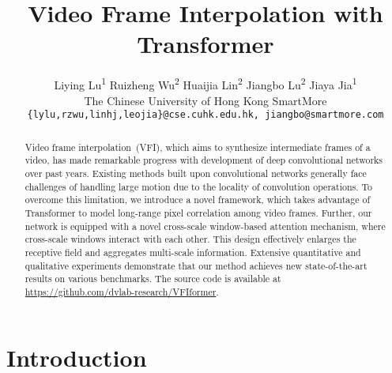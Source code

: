 \documentclass[10pt,twocolumn,letterpaper]{article}
\begin{document}
	
\title{Video Frame Interpolation with Transformer}
	
	\author{
		Liying Lu\textsuperscript{1} \quad Ruizheng Wu\textsuperscript{2} \quad Huaijia Lin\textsuperscript{2} \quad  Jiangbo Lu\textsuperscript{2} \quad Jiaya Jia\textsuperscript{1}\\
		 The Chinese University of Hong Kong \qquad
		 SmartMore\\
		{\tt\small \{lylu,rzwu,linhj,leojia\}@cse.cuhk.edu.hk, jiangbo@smartmore.com} 
	}
	
	
	\maketitle
	
\begin{abstract}
		Video frame interpolation~(VFI), which aims to synthesize intermediate frames of a video, has made remarkable progress with development of deep convolutional networks over past years. Existing methods built upon convolutional networks generally face challenges of handling large motion due to the locality of convolution operations. To overcome this limitation, we introduce a novel framework, which takes advantage of Transformer to model long-range pixel correlation among video frames. Further, our network is equipped with a novel cross-scale window-based attention mechanism, where cross-scale windows interact with each other. This design effectively enlarges the receptive field and aggregates multi-scale information. Extensive quantitative and qualitative experiments demonstrate that our method achieves new state-of-the-art results on various benchmarks. The source code is available at \href{https://github.com/dvlab-research/VFIformer}{https://github.com/dvlab-research/VFIformer}.
\end{abstract}
	


	
	
	
	
	\section{Introduction}
	\label{sec:intro}
	
	
	
\end{document}
